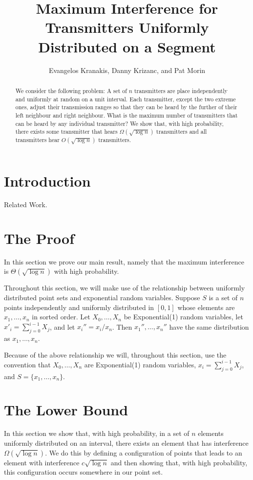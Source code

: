 \documentclass{patmorin}
\title{Maximum Interference for Transmitters Uniformly Distributed on a Segment}
\author{Evangelos Kranakis, Danny Krizanc, and Pat Morin}
\begin{document}
\maketitle

\begin{abstract}
We consider the following problem: A set of $n$ transmitters are
place independently and uniformly at random on a unit interval.  Each
transmitter, except the two extreme ones, adjust their transmission ranges
so that they can be heard by the further of their left neighbour and right
neighbour.  What is the maximum number of transmitters that can be heard
by any individual transmitter?  We show that, with high probability,
there exists some transmitter that hears $\Omega(\sqrt{\log n})$
transmitters and all transmitters hear $O(\sqrt{\log n})$ transmitters.
\end{abstract}

\section{Introduction}

Related Work.

\section{The Proof}

In this section we prove our main result, namely that the maximum
interference is $\Theta(\sqrt{\log n})$ with high probability.

Throughout this section, we will make use of the relationship between
uniformly distributed point sets and exponential random variables.
Suppose $S$ is a set of $n$ points independently and uniformly
distributed in $[0,1]$ whose elements are $x_1,\ldots,x_n$
in sorted order.  Let $X_0,\ldots,X_n$ be Exponential(1) random
variables, let $x'_i=\sum_{j=0}^{i-1}X_j$, and let $x_i''=x_i/x_n$.
Then $x_1'',\ldots,x_n''$ have the same distribution as $x_1,\ldots,x_n$.

Because of the above relationship we will, throughout this section, use
the convention that $X_0,\ldots,X_n$ are Exponential(1) random variables,
$x_i=\sum_{j=0}^{i-1}X_j$, and $S=\{x_1,\ldots,x_n\}$.

\section{The Lower Bound}

In this section we show that, with high probability, in a set of $n$
elements uniformly distributed on an interval, there exists an element
that has interference $\Omega(\sqrt{\log n})$.  We do this by defining
a configuration of points that leads to an element with interference
$c\sqrt{\log n}$ and then showing that, with high probability, this
configuration occurs somewhere in our point set.
\end{document}

